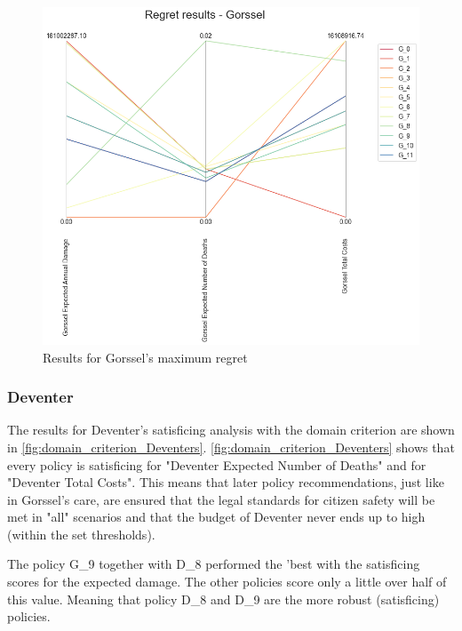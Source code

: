 \begin{figure}[H]
\begin{minipage}[b]{0.4\textwidth}
    \includegraphics[width=1.15\textwidth]{report/figures/results/regret_figure_Gorssel.png}
    \caption{Results for Gorssel's maximum regret}
    \label{fig:regret_gorssel}
  \end{minipage}
\end{figure}




\subsubsection{Deventer}
The results for Deventer's satisficing analysis with the domain criterion are shown in  \autoref{fig:domain_criterion_Deventers}. 
\autoref{fig:domain_criterion_Deventers} shows that every policy is satisficing for "Deventer Expected Number of Deaths" and for "Deventer Total Costs". This means that later policy recommendations, just like in Gorssel's care, are ensured that the legal standards for citizen safety will be met in "all" scenarios and that the budget of Deventer never ends up to high (within the set thresholds). \newline 

\noindent The policy G\_9 together with D\_8 performed the 'best with the satisficing scores for the expected damage. The other policies score only a little over half of this value. Meaning that policy D\_8 and D\_9 are the more robust (satisficing) policies. \newline

